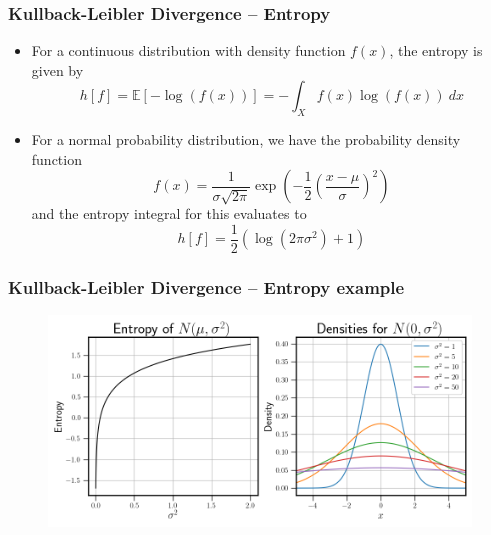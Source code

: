 \documentclass[11pt,aspectratio=169]{beamer}
\newcommand{\parens}[1]{\left(#1\right)}
\newcommand{\sqbracks}[1]{\left[#1\right]}
\begin{document}
    \begin{frame}
        \frametitle{Kullback-Leibler Divergence -- Entropy}
        \begin{itemize}
            \item 
            For a
            continuous distribution with density function $f(x)$, the entropy is given by 
            \begin{equation}
                h[f] = \mathbb{E}\sqbracks{-\log(f(x))} = -\int_X f(x)\log(f(x))\ dx    
            \end{equation}
            \item
            For a normal probability distribution, we have the probability density function
            \begin{equation}
            f(x) = \frac{1}{\sigma\sqrt{2\pi}}\exp\parens{-\frac{1}{2}\parens{\frac{x-\mu}{\sigma}}^2} 
            \label{eqn:normal} 
            \end{equation}
            and the entropy integral for this evaluates to
            \begin{equation}
                h[f] = \frac{1}{2}\parens{\log(2\pi\sigma^2) + 1}
            \end{equation}
        \end{itemize}
    \end{frame}

    \begin{frame}
        \frametitle{Kullback-Leibler Divergence -- Entropy example}
        \begin{figure}
            \centering
            \includegraphics[width=\textwidth]{../Figures/entropy_densities_example.png}
        \end{figure}
    \end{frame}
\end{document}
